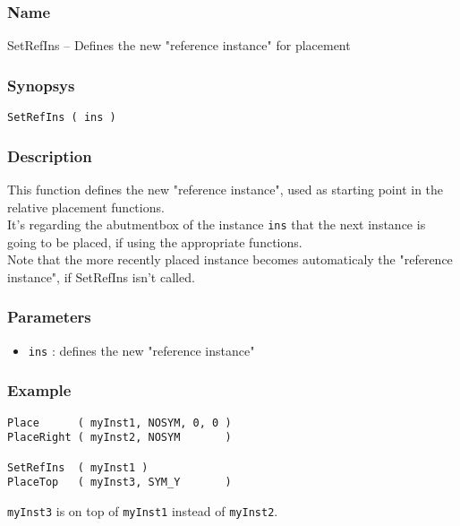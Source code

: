 \subsubsection{Name}

SetRefIns -- Defines the new "reference instance" for placement

\subsubsection{Synopsys}

\begin{verbatim}
SetRefIns ( ins )
\end{verbatim}

\subsubsection{Description}

This function defines the new "reference instance", used as starting point in the relative placement functions.\\
\indent It's regarding the abutmentbox of the instance \verb-ins- that the next instance is going to be placed, if using the appropriate functions.\\
    
\indent Note that the more recently placed instance becomes automaticaly the "reference instance", if SetRefIns isn't called.
    
\subsubsection{Parameters}

\begin{itemize}
    \item \verb-ins- : defines the new "reference instance"
\end{itemize}
    
\subsubsection{Example}

\begin{verbatim}
Place      ( myInst1, NOSYM, 0, 0 )
PlaceRight ( myInst2, NOSYM       )

SetRefIns  ( myInst1 )
PlaceTop   ( myInst3, SYM_Y       )
\end{verbatim}

\indent \verb-myInst3- is on top of \verb-myInst1- instead of \verb-myInst2-.

